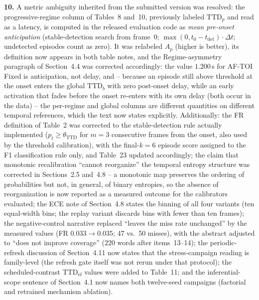 \documentclass[1p,12pt,authoryear]{elsarticle}
\begin{document}
\vspace{2mm}
\noindent \textbf{10.} A metric ambiguity inherited from the submitted version was resolved: the progressive-regime column of Tables~8 and~10, previously labeled $\mathrm{TTD}_p$ and read as a latency, is computed in the released evaluation code as \emph{mean pre-onset anticipation} (stable-detection search from frame~0; $\max(0, t_0 - t_{\mathrm{det}})\cdot\Delta t$; undetected episodes count as zero). It was relabeled $A_p$ (higher is better), its definition now appears in both table notes, and the Regime-asymmetry paragraph of Section~4.4 was corrected accordingly: the value $1.200$\,s for AF-TOI Fixed is anticipation, not delay, and -- because an episode still above threshold at the onset enters the global $\mathrm{TTD}_b$ with zero post-onset delay, while an early activation that fades before the onset re-enters with its own delay (both occur in the data) -- the per-regime and global columns are different quantities on different temporal references, which the text now states explicitly. Additionally: the FR definition of Table~2 was corrected to the stable-detection rule actually implemented ($p_t \ge \theta_{\mathrm{TTD}}$ for $m{=}3$ consecutive frames from the onset, also used by the threshold calibration), with the final-$k{=}6$ episode score assigned to the F1 classification rule only, and Table~23 updated accordingly; the claim that monotonic recalibration ``cannot reorganize'' the temporal entropy structure was corrected in Sections~2.5 and~4.8 -- a monotonic map preserves the ordering of probabilities but not, in general, of binary entropies, so the absence of reorganization is now reported as a measured outcome for the calibrators evaluated; the ECE note of Section~4.8 states the binning of all four variants (ten equal-width bins; the replay variant discards bins with fewer than ten frames); the negative-control narrative replaced ``leaves the miss rate unchanged'' by the measured values (FR $0.033 \rightarrow 0.035$; 47 vs.\ 50 misses), with the abstract adjusted to ``does not improve coverage'' (220 words after items~13--14); the periodic-refresh discussion of Section~4.11 now states that the stress-campaign reading is family-level (the refresh gate itself was not rerun under that protocol); the scheduled-contrast $\mathrm{TTD}_{\mathrm{ef}}$ values were added to Table~11; and the inferential-scope sentence of Section~4.1 now names both twelve-seed campaigns (factorial and retrained mechanism ablation).
\end{document}

